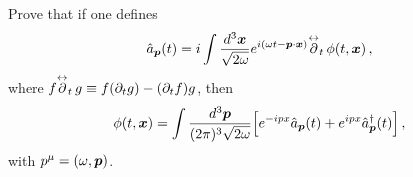 \begin{ex} \label{ex_28} 
    Prove that if one defines
    \begin{equation}
        \hat{a}_{\boldsymbol{p}}(t) = i \int \frac{d^3 \boldsymbol{x}}{\sqrt{2\omega}} e^{i(\omega t - \boldsymbol{p} \cdot \boldsymbol{x})} \overset{\leftrightarrow}{\partial}_t \,  \phi(t,\boldsymbol{x}) \, , 
        \label{Eq_Ex28_ades_t_def}
    \end{equation}
    where $f \overset{\leftrightarrow}{\partial}_t \, g \equiv f (\partial_t g) - (\partial_t f) g$, then
    \begin{equation}
        \phi(t,\boldsymbol{x}) = \int \frac{d^3 \boldsymbol{p}}{(2\pi)^3 \sqrt{2\omega}} \Big[e^{-ipx} \hat{a}_{\boldsymbol{p}}(t) + e^{ipx} \hat{a}^\dagger_{\boldsymbol{p}}(t)\Big] \, , 
        \label{Eq_Ex28_phi}
    \end{equation}
    with $p^\mu = (\omega, \boldsymbol{p})$.
\end{ex}


